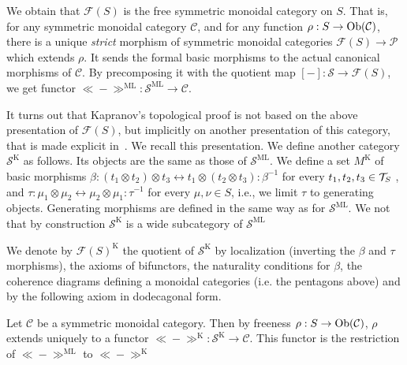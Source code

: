 We obtain that $\mathcal{F}(S)$ is the free  symmetric monoidal category on $S$. 
That is, for any symmetric monoidal category $\mathcal{C}$, and for any function $\rho : S \to \mathrm{Ob}(\mathcal{C})$, there is a unique \emph{strict} morphism of symmetric monoidal categories $\mathcal{F}(S) \to \mathcal{P}$ which extends $\rho$. It sends the formal basic morphisms to the actual canonical morphisms of $\mathcal{C}$.
By precomposing it with the quotient map $[-]:\mathcal{S} \to \mathcal{F}(S)$, we get  functor $\ll\!-\!\gg^{\mathrm{ML}}:\mathcal{S}^{\mathrm{ML}} \to \mathcal{C}$.

\smallskip
It turns out that Kapranov's topological proof is not based on the above presentation of $\mathcal{F}(S)$, but implicitly on another presentation of this category, that is made explicit in~\cite{baralicSimplePermutoassociahedron2019}. 
We recall this presentation. We define another category $\mathcal{S}^{\mathrm{K}}$ as follows. Its objects are the same as those of $\mathcal{S}^{\mathrm{ML}}$. We define a set $M^{\mathrm{K}}$ of basic morphisms $\beta: (t_1 \otimes t_2) \otimes t_3 \leftrightarrow t_1 \otimes (t_2\otimes t_3) : \beta^{-1}$ for every $t_1,t_2,t_3  \in {\cal T}_S$ , and $\tau: \mu_1\otimes \mu_2 \leftrightarrow \mu_2 \otimes \mu_1 : \tau^{-1}$ for every $\mu,\nu  \in S$, i.e., we limit $\tau$ to generating objects.
Generating morphisms are defined in the same way as for $\mathcal{S}^{\mathrm{ML}}$.
We not that by construction $\mathcal{S}^{\mathrm{K}}$ is a wide subcategory of $\mathcal{S}^{\mathrm{ML}}$

\begin{definition}
    We denote   by $\mathcal{F}(S)^{\mathrm{K}}$ the quotient of $\mathcal{S}^{\mathrm{K}}$ by localization (inverting the $\beta$ and $\tau$ morphisms), the axioms of bifunctors, the naturality conditions for $\beta$, the coherence diagrams defining a  monoidal categories (i.e. the pentagons above) and by the following axiom in dodecagonal form.
\end{definition}
Let $\mathcal{C}$  be a symmetric monoidal category. Then by freeness  $\rho : S \to \mathrm{Ob}(\mathcal{C})$, $\rho$ extends uniquely to a functor $\ll\!-\!\gg^{\mathrm{K}}:\mathcal{S}^{\mathrm{K}} \to \mathcal{C}$.
This functor is the restriction of $\ll\!-\!\gg^{\mathrm{ML}}$ to $\ll\!-\!\gg^{\mathrm{K}}$




